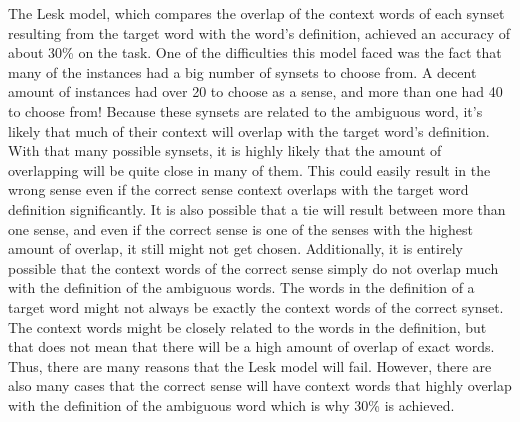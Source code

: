 \documentclass{article}
\begin{document}
The Lesk model, which compares the overlap of the context words of each synset resulting from the target word with the word's definition, achieved an accuracy of about 30\% on the task.  One of the difficulties this model faced was the fact that many of the instances had a big number of synsets to choose from.  A decent amount of instances had over 20 to choose as a sense, and more than one had 40 to choose from!  Because these synsets are related to the ambiguous word, it's likely that much of their context will overlap with the target word's definition.  With that many possible synsets, it is highly likely that the amount of overlapping will be quite close in many of them.  This could easily result in the wrong sense even if the correct sense context overlaps with the target word definition significantly.  It is also possible that a tie will result between more than one sense, and even if the correct sense is one of the senses with the highest amount of overlap, it still might not get chosen.  Additionally, it is entirely possible that the context words of the correct sense simply do not overlap much with the definition of the ambiguous words.  The words in the definition of a target word might not always be exactly the context words of the correct synset.  The context words might be closely related to the words in the definition, but that does not mean that there will be a high amount of overlap of exact words.  Thus, there are many reasons that the Lesk model will fail.  However, there are also many cases that the correct sense will have context words that highly overlap with the definition of the ambiguous word which is why 30\% is achieved.
\end{document}
